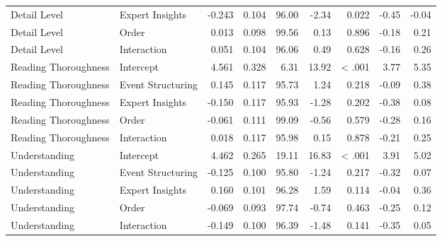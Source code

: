 \begin{longtable}{l l r r r r r r r}
Detail Level & Expert Insights & -0.243 & 0.104 & 96.00 & -2.34 & 0.022 & -0.45 & -0.04\\*
Detail Level & Order & 0.013 & 0.098 & 99.56 & 0.13 & 0.896 & -0.18 & 0.21\\*
Detail Level & Interaction & 0.051 & 0.104 & 96.06 & 0.49 & 0.628 & -0.16 & 0.26\\*
Reading Thoroughness & Intercept & 4.561 & 0.328 & 6.31 & 13.92 & < .001 & 3.77 & 5.35\\*
Reading Thoroughness & Event Structuring & 0.145 & 0.117 & 95.73 & 1.24 & 0.218 & -0.09 & 0.38\\*
Reading Thoroughness & Expert Insights & -0.150 & 0.117 & 95.93 & -1.28 & 0.202 & -0.38 & 0.08\\*
Reading Thoroughness & Order & -0.061 & 0.111 & 99.09 & -0.56 & 0.579 & -0.28 & 0.16\\*
Reading Thoroughness & Interaction & 0.018 & 0.117 & 95.98 & 0.15 & 0.878 & -0.21 & 0.25\\*
Understanding & Intercept & 4.462 & 0.265 & 19.11 & 16.83 & < .001 & 3.91 & 5.02\\*
Understanding & Event Structuring & -0.125 & 0.100 & 95.80 & -1.24 & 0.217 & -0.32 & 0.07\\*
Understanding & Expert Insights & 0.160 & 0.101 & 96.28 & 1.59 & 0.114 & -0.04 & 0.36\\*
Understanding & Order & -0.069 & 0.093 & 97.74 & -0.74 & 0.463 & -0.25 & 0.12\\*
Understanding & Interaction & -0.149 & 0.100 & 96.39 & -1.48 & 0.141 & -0.35 & 0.05\\*
\end{longtable}
